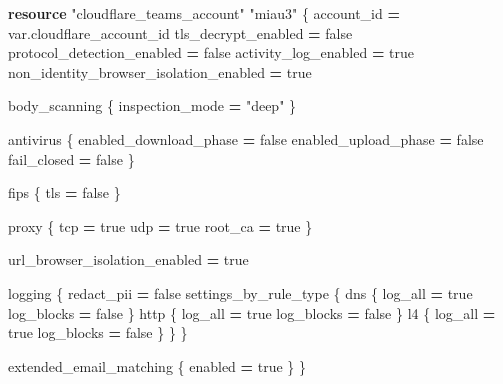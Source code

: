 \documentclass[
]{article}
\newenvironment{Shaded}{\begin{snugshade}}{\end{snugshade}}
\newcommand{\KeywordTok}[1]{\textcolor[rgb]{0.13,0.29,0.53}{\textbf{#1}}}
\newcommand{\NormalTok}[1]{#1}
\newcommand{\OperatorTok}[1]{\textcolor[rgb]{0.81,0.36,0.00}{\textbf{#1}}}
\newcommand{\StringTok}[1]{\textcolor[rgb]{0.31,0.60,0.02}{#1}}
\newcommand{\VariableTok}[1]{\textcolor[rgb]{0.00,0.00,0.00}{#1}}
\begin{document}
\begin{Shaded}
\begin{Highlighting}[numbers=left,,]
\KeywordTok{resource} \StringTok{"cloudflare\_teams\_account"} \StringTok{"miau3"}\NormalTok{ \{}
\NormalTok{  account\_id                             }\OperatorTok{=} \VariableTok{var}\NormalTok{.cloudflare\_account\_id}
\NormalTok{  tls\_decrypt\_enabled                    }\OperatorTok{=} \VariableTok{false}
\NormalTok{  protocol\_detection\_enabled             }\OperatorTok{=} \VariableTok{false}
\NormalTok{  activity\_log\_enabled                   }\OperatorTok{=} \VariableTok{true}
\NormalTok{  non\_identity\_browser\_isolation\_enabled }\OperatorTok{=} \VariableTok{true}

\NormalTok{  body\_scanning \{}
\NormalTok{    inspection\_mode }\OperatorTok{=} \StringTok{"deep"}
\NormalTok{  \}}

\NormalTok{  antivirus \{}
\NormalTok{    enabled\_download\_phase }\OperatorTok{=} \VariableTok{false}
\NormalTok{    enabled\_upload\_phase   }\OperatorTok{=} \VariableTok{false}
\NormalTok{    fail\_closed            }\OperatorTok{=} \VariableTok{false}
\NormalTok{  \}}

\NormalTok{  fips \{}
\NormalTok{    tls }\OperatorTok{=} \VariableTok{false}
\NormalTok{  \}}

\NormalTok{  proxy \{}
\NormalTok{    tcp     }\OperatorTok{=} \VariableTok{true}
\NormalTok{    udp     }\OperatorTok{=} \VariableTok{true}
\NormalTok{    root\_ca }\OperatorTok{=} \VariableTok{true}
\NormalTok{  \}}

\NormalTok{  url\_browser\_isolation\_enabled }\OperatorTok{=} \VariableTok{true}

\NormalTok{  logging \{}
\NormalTok{    redact\_pii }\OperatorTok{=} \VariableTok{false}
\NormalTok{    settings\_by\_rule\_type \{}
\NormalTok{      dns \{}
\NormalTok{        log\_all    }\OperatorTok{=} \VariableTok{true}
\NormalTok{        log\_blocks }\OperatorTok{=} \VariableTok{false}
\NormalTok{      \}}
\NormalTok{      http \{}
\NormalTok{        log\_all    }\OperatorTok{=} \VariableTok{true}
\NormalTok{        log\_blocks }\OperatorTok{=} \VariableTok{false}
\NormalTok{      \}}
\NormalTok{      l4 \{}
\NormalTok{        log\_all    }\OperatorTok{=} \VariableTok{true}
\NormalTok{        log\_blocks }\OperatorTok{=} \VariableTok{false}
\NormalTok{      \}}
\NormalTok{    \}}
\NormalTok{  \}}

\NormalTok{  extended\_email\_matching \{}
\NormalTok{    enabled }\OperatorTok{=} \VariableTok{true}
\NormalTok{  \}}
\NormalTok{\}}
\end{Highlighting}
\end{Shaded}
\end{document}
